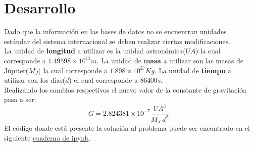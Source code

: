 \documentclass[11pt,a4paper]{article}
\begin{document}
\section{\label{desa}Desarrollo}
{
Dado que la información en las bases de datos no se encuentran unidades estándar del sistema internacional se deben realizar ciertas modificaciones.\\
La unidad de \textbf{longitud} a utilizar es la unidad astronómica($UA$) la cual corresponde a $1.49598 \times 10^{11} m$.
La unidad de \textbf{masa} a utilizar son las masas de Júpiter($M_J$) la cual  corresponde a $1.898 \times 10^{27} Kg$.
La unidad de \textbf{tiempo} a utilizar son los días($d$) el cual corresponde a $86400 s$.\\

Realizando los cambios respectivos el nuevo valor de la constante de gravitación pasa a ser:
\begin{equation}
G = 2.824381 \times 10^{-7} \dfrac{UA^3}{M_J\ d^2}
\end{equation}
El código donde está presente la solución al problema puede ser encontrado en el siguiente \href{https://github.com/diegolramirez/MC/blob/master/Proyecto/proyecto.ipynb}{cuaderno de ipynb}.
}
\end{document}
